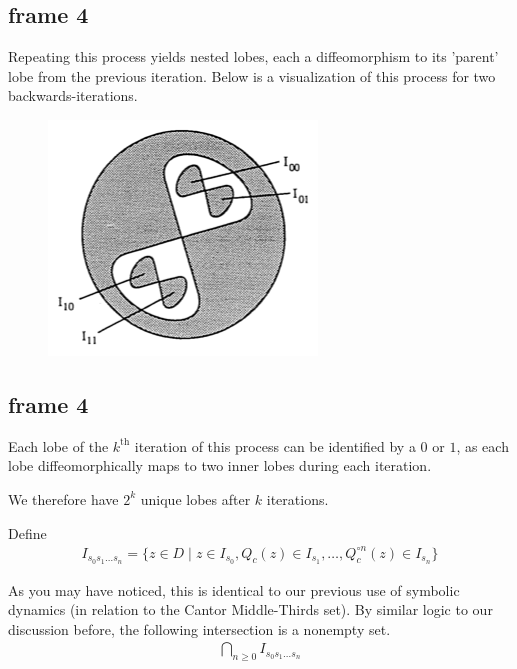 \documentclass[xcolor=x11names,compress]{beamer}
\renewcommand{\(}{\begin{columns}}
\renewcommand{\)}{\end{columns}}
\newcommand{\<}[1]{\begin{column}{#1}}
\renewcommand{\>}{\end{column}}
\begin{document}
\subsection{frame 4}
\begin{frame}

Repeating this process yields nested lobes, each a diffeomorphism to its 'parent' lobe from the previous iteration. Below is a visualization of this process for two backwards-iterations.

\pause

\begin{figure}
\includegraphics[scale=.4]{lobes2.png}
\end{figure}

\end{frame}


\subsection{frame 4}
\begin{frame}

Each lobe of the $k^{\text{th}}$ iteration of this process can be identified by a $0$ or $1$, as each lobe 
diffeomorphically maps to two inner lobes during each iteration. 

\vspace{.4cm}
\pause

We therefore have $2^k$ unique lobes after $k$ iterations.

\vspace{.4cm}
\pause

Define
\begin{align*}
I_{s_0s_1\ldots s_n} = \{z\in D \; | \;  z \in I_{s_0}, Q_c(z) \in I_{s_1}, \ldots, Q_c^{\circ n}(z) \in I_{s_n}\}
\end{align*}

\pause

As you may have noticed, this is identical to our previous use of symbolic dynamics (in relation
to the Cantor Middle-Thirds set). By similar logic to our discussion before, the following  
intersection is a nonempty set.
\begin{align*}
\bigcap\limits_{n\ge 0} I_{s_0s_1 \ldots s_n}
\end{align*}



\end{frame}
\end{document}
